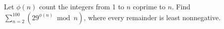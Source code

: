 Let $\phi(n)$ count the integers from 1 to $n$ coprime to $n$. Find $\sum_{n=2}^{100}(29^{\phi(n)}\bmod n)$, where every remainder is least nonnegative.
